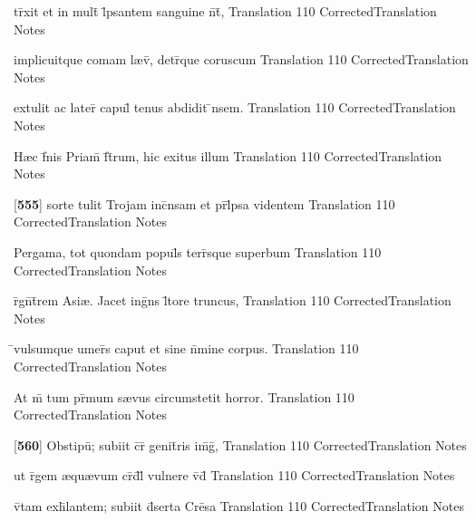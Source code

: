 \latline
  {tr\={}xit et in mult\={} l\={}psantem sanguine n\={}t\={\macron {\i}},}
  { Translation }
  {110}
  { CorrectedTranslation }
  { Notes }


\latline
  {implicuitque comam l{\ae}v\={}, detr\={}que coruscum}
  { Translation }
  {110}
  { CorrectedTranslation }
  { Notes }


\latline
  {extulit ac later\={\macron {\i}} capul\={} tenus abdidit \={}nsem.}
  { Translation }
  {110}
  { CorrectedTranslation }
  { Notes }


\latline
  {H{\ae}c f\={\macron {\i}}nis Priam\={\macron {\i}} f\={}t\={}rum, hic exitus illum}
  { Translation }
  {110}
  { CorrectedTranslation }
  { Notes }


\latline
  {[\textbf{555}] sorte tulit Trojam inc\={}nsam et pr\={}l\={}psa videntem}
  { Translation }
  {110}
  { CorrectedTranslation }
  { Notes }


\latline
  {Pergama, tot quondam popul\={\macron {\i}}s terr\={\macron {\i}}sque superbum}
  { Translation }
  {110}
  { CorrectedTranslation }
  { Notes }


\latline
  {r\={}gn\={}t\={}rem Asi{\ae}.  Jacet ing\={}ns l\={\macron {\i}}tore truncus,}
  { Translation }
  {110}
  { CorrectedTranslation }
  { Notes }


\latline
  {\={}vulsumque umer\={\macron {\i}}s caput et sine n\={}mine corpus.}
  { Translation }
  {110}
  { CorrectedTranslation }
  { Notes }


\latline
  {At m\={} tum pr\={\macron {\i}}mum s{\ae}vus circumstetit horror.}
  { Translation }
  {110}
  { CorrectedTranslation }
  { Notes }


\latline
  {[\textbf{560}] Obstipu\={\macron {\i}}; subiit c\={}r\={\macron {\i}} genit\={}ris im\={}g\={},}
  { Translation }
  {110}
  { CorrectedTranslation }
  { Notes }


\latline
  {ut r\={}gem {\ae}qu{\ae}vum cr\={}d\={}l\={\macron {\i}} vulnere v\={\macron {\i}}d\={\macron {\i}}}
  { Translation }
  {110}
  { CorrectedTranslation }
  { Notes }


\latline
  {v\={\macron {\i}}tam exh\={}lantem; subiit d\={}serta Cre\={}sa }
  { Translation }
  {110}
  { CorrectedTranslation }
  { Notes }


